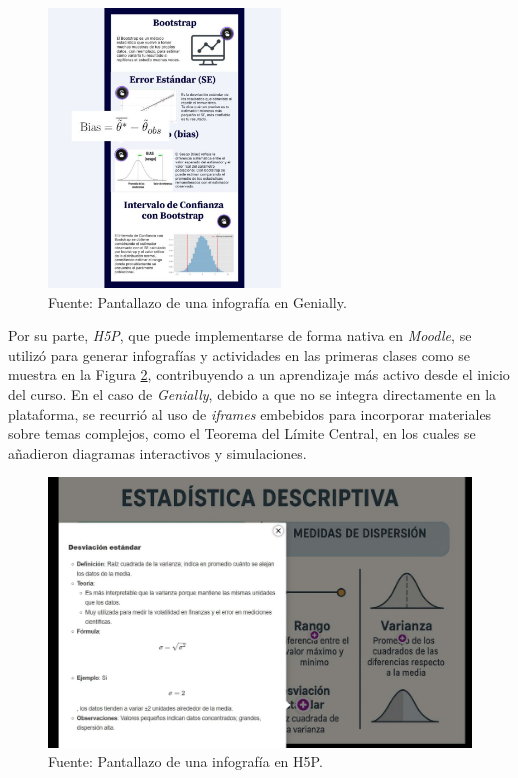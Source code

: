 \documentclass[letter,oneside,12pt,spanish]{report}
\begin{document}
\begin{figure}[ht]
	\centering
	\includegraphics[width=0.55\textwidth]{Figs/Infografia_Genially.pdf}
	\label{fig:Igenially}
	\\Fuente: Pantallazo de una infografía en Genially.
\end{figure}

Por su parte, \textit{H5P}, que puede implementarse de forma nativa en \textit{Moodle}, se utilizó para generar infografías y actividades en las primeras clases como se muestra en la Figura \ref{fig:H5P}, contribuyendo a un aprendizaje más activo desde el inicio del curso. En el caso de \textit{Genially}, debido a que no se integra directamente en la plataforma, se recurrió al uso de \textit{iframes} embebidos para incorporar materiales sobre temas complejos, como el Teorema del Límite Central, en los cuales se añadieron diagramas interactivos y simulaciones.

\begin{figure}[ht]
	\centering
	\includegraphics[width=1\textwidth]{Figs/Infografia_H5P.pdf}
	\label{fig:H5P}
	\\Fuente: Pantallazo de una infografía en H5P.
\end{figure}
\end{document}
